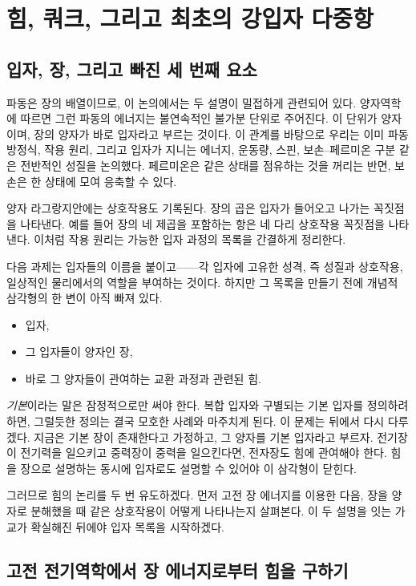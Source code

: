 \chapter{힘, 쿼크, 그리고 최초의 강입자 다중항}

\section{입자, 장, 그리고 빠진 세 번째 요소}

파동은 장의 배열이므로, 이 논의에서는 두 설명이 밀접하게 관련되어 있다. 양자역학에 따르면 그런 파동의 에너지는 불연속적인 불가분 단위로 주어진다. 이 단위가 양자이며, 장의 양자가 바로 입자라고 부르는 것이다. 이 관계를 바탕으로 우리는 이미 파동방정식, 작용 원리, 그리고 입자가 지니는 에너지, 운동량, 스핀, 보손--페르미온 구분 같은 전반적인 성질을 논의했다. 페르미온은 같은 상태를 점유하는 것을 꺼리는 반면, 보손은 한 상태에 모여 응축할 수 있다.

양자 라그랑지안에는 상호작용도 기록된다. 장의 곱은 입자가 들어오고 나가는 꼭짓점을 나타낸다. 예를 들어 장의 네 제곱을 포함하는 항은 네 다리 상호작용 꼭짓점을 나타낸다. 이처럼 작용 원리는 가능한 입자 과정의 목록을 간결하게 정리한다.

다음 과제는 입자들의 이름을 붙이고------각 입자에 고유한 성격, 즉 성질과 상호작용, 일상적인 물리에서의 역할을 부여하는 것이다. 하지만 그 목록을 만들기 전에 개념적 삼각형의 한 변이 아직 빠져 있다.
\begin{itemize}
\item 입자,
\item 그 입자들이 양자인 장,
\item 바로 그 양자들이 관여하는 교환 과정과 관련된 힘.
\end{itemize}

\emph{기본}이라는 말은 잠정적으로만 써야 한다. 복합 입자와 구별되는 기본 입자를 정의하려 하면, 그럴듯한 정의는 결국 모호한 사례와 마주치게 된다. 이 문제는 뒤에서 다시 다루겠다. 지금은 기본 장이 존재한다고 가정하고, 그 양자를 기본 입자라고 부르자. 전기장이 전기력을 일으키고 중력장이 중력을 일으킨다면, 전자장도 힘에 관여해야 한다. 힘을 장으로 설명하는 동시에 입자로도 설명할 수 있어야 이 삼각형이 닫힌다.

그러므로 힘의 논리를 두 번 유도하겠다. 먼저 고전 장 에너지를 이용한 다음, 장을 양자로 분해했을 때 같은 상호작용이 어떻게 나타나는지 살펴본다. 이 두 설명을 잇는 가교가 확실해진 뒤에야 입자 목록을 시작하겠다.

\section{고전 전기역학에서 장 에너지로부터 힘을 구하기}

